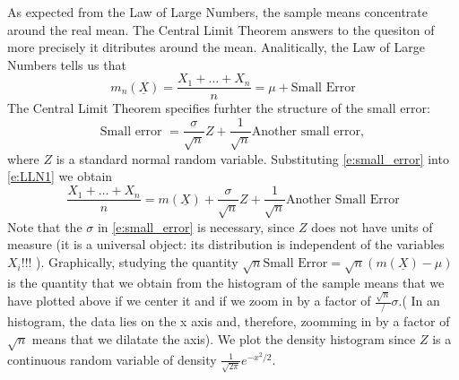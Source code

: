       As expected from the Law of Large Numbers, the sample means concentrate around the real mean. The Central Limit Theorem answers to the quesiton of more precisely it ditributes around the mean. Analitically, the Law of Large Numbers tells us that
      \begin{equation}
	      \label{e:LLN1}
      	m_n(\underline X) = \frac{X_1 + \ldots + X_n}{n} = \mu + \text{Small Error}
      \end{equation}
      The Central Limit Theorem specifies furhter the structure of the small error: 
      \begin{equation}
      	\label{e:small_error}
      	\text{Small error } = \frac{\sigma}{\sqrt{n}} Z  + \frac{1}{\sqrt{n}} \textrm{Another small error}, 
      \end{equation}
      where $Z$ is a standard normal random variable.  Substituting \eqref{e:small_error} into \eqref{e:LLN1} we obtain 
      \begin{equation}
      	\frac{X_1 + \ldots + X_n}{n} = m(\underline X ) + \frac{\sigma }{\sqrt{n}}Z + \frac{1}{\sqrt{n}} \text{Another Small Error}
      \end{equation}
      Note that the $\sigma$ in \eqref{e:small_error} is necessary, since $Z$ does not have units of measure  (it is a universal object: its distribution is independent of the variables $X_i$!!! ). 
      Graphically, studying the quantity $\sqrt{n}\text{Small Error} = \sqrt{n} ( m(\underline X) - \mu)$ is the quantity that we obtain from the histogram of the sample means that we have plotted above if we center it and if we zoom in by a factor of $ \frac{\sqrt{n}}/\sigma$.( In an histogram, the data lies on the x axis and, therefore, zoomming in by a factor of $\sqrt{n}$ means that we dilatate the axis). We plot the density histogram since $Z$ is a continuous random variable   of density $\frac{1}{\sqrt{2\pi}}e^{-x^2/2}$. 
